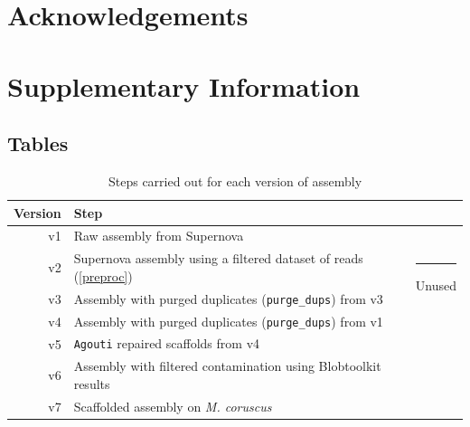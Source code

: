 \documentclass[11pt, a4paper]{article}
\begin{document}



\section*{Acknowledgements}


\printbibliography


\newpage
\appendix
\setcounter{table}{0}
\renewcommand{\thetable}{S\arabic{table}}
\setcounter{figure}{0}
\renewcommand{\thefigure}{S\arabic{figure}}
\section*{Supplementary Information}

\subsection*{Tables}

\begin{table}[h]
	\caption{Steps carried out for each version of assembly}
	\label{suptab:versions}
	\begin{tabular}{rll}
		Version & Step & \\ \toprule
		\rowcolor{gray!20}
		v1 & Raw assembly from Supernova & \\
		v2 & Supernova assembly using a filtered dataset of reads (\cref{preproc}) & \multirow{2}{*}{\rule{1pt}{25pt} Unused} \\
		v3 & Assembly with purged duplicates (\texttt{purge\_dups}) from v3 & \\
		\rowcolor{gray!20}
		v4 & Assembly with purged duplicates (\texttt{purge\_dups}) from v1 & \\
		\rowcolor{gray!20}
		v5 & \texttt{Agouti} repaired scaffolds from v4 & \\
		\rowcolor{gray!20}
		v6 & Assembly with filtered contamination using Blobtoolkit results & \\
		\rowcolor{gray!20}
		v7 & Scaffolded assembly on \textit{M. coruscus} & \\ \bottomrule
	\end{tabular}
\end{table}
\vspace{3em}
\end{document}
